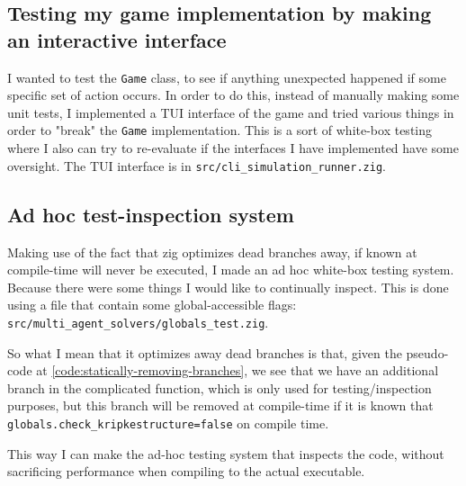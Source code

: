 \subsection{Testing my game implementation by making an interactive interface}
I wanted to test the {\tt Game} class, to see if anything unexpected happened if some specific set of action occurs. In order to do this, instead of manually making some unit tests, I implemented a TUI interface of the game and tried various things in order to "break" the {\tt Game} implementation. This is a sort of white-box testing where I also can try to re-evaluate if the interfaces I have implemented have some oversight. The TUI interface is in {\tt src/cli\_simulation\_runner.zig}.


\subsection{Ad hoc test-inspection system}
Making use of the fact that zig optimizes dead branches away, if known at compile-time will never be executed, I made an ad hoc white-box testing system. Because there were some things I would like to continually inspect. This is done using a file that contain some global-accessible flags: {\tt src/multi\_agent\_solvers/globals\_test.zig}.

So what I mean that it optimizes away dead branches is that, given the pseudo-code at \ref{code:statically-removing-branches}, we see that we have an additional branch in the complicated function, which is only used for testing/inspection purposes, but this branch will be removed at compile-time if it is known that {\tt globals.check\_kripkestructure=false} on compile time.

This way I can make the ad-hoc testing system that inspects the code, without sacrificing performance when compiling to the actual executable.

\begin{verbbox}
function some_complicated_function(game, kripkestructure):
    if(globals.check_kripkestructure){
        for each element in kripkestructure{
            print(element)
        }
    }
    // function continues to do other work
}
\end{verbbox}
{\centering
\fbox{\theverbbox}
\par
\label{code:statically-removing-branches}
}

